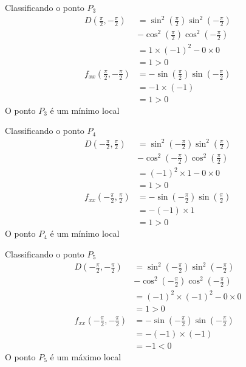 \documentclass[a4paper,12pt,fleqn]{article}
\begin{document}
\begin{answer}
\begin{multicols}{2}
    \vspace{\baselineskip}
    Classificando o ponto $P_3$
    \begin{align*}
      D\left(\frac{\pi}{2}, -\frac{\pi}{2}\right)
      & = \sin^2\left( \frac{\pi}{2}\right)
          \sin^2\left(-\frac{\pi}{2}\right) \\
      & - \cos^2\left( \frac{\pi}{2}\right)
          \cos^2\left(-\frac{\pi}{2}\right) \\
      & = 1 \times (-1)^2 - 0 \times 0 \\
      &  = 1 > 0  \\
      f_{xx}\left(\frac{\pi}{2},-\frac{\pi}{2}\right)
      & = -\sin\left( \frac{\pi}{2}\right)
           \sin\left(-\frac{\pi}{2}\right) \\
      & = -1\times (-1) \\
      &  = 1 > 0
    \end{align*}
    O ponto $P_3$ é um mínimo local

    \vspace{\baselineskip}
    Classificando o ponto $P_4$
    \begin{align*}
      D\left(-\frac{\pi}{2}, \frac{\pi}{2}\right)
      & = \sin^2\left(-\frac{\pi}{2}\right)
          \sin^2\left( \frac{\pi}{2}\right) \\
      & - \cos^2\left(-\frac{\pi}{2}\right)
          \cos^2\left( \frac{\pi}{2}\right) \\
      & = (-1)^2 \times 1 - 0 \times 0 \\
      &  = 1 > 0  \\
      f_{xx}\left(-\frac{\pi}{2}, \frac{\pi}{2}\right)
      & = -\sin\left(-\frac{\pi}{2}\right)
           \sin\left( \frac{\pi}{2}\right) \\
      & = -(-1)\times 1 \\
      &  = 1 > 0
    \end{align*}
    O ponto $P_4$ é um mínimo local

    \vspace{\baselineskip}
    Classificando o ponto $P_5$
    \begin{align*}
      D\left(-\frac{\pi}{2}, -\frac{\pi}{2}\right)
      & = \sin^2\left(-\frac{\pi}{2}\right)
          \sin^2\left(-\frac{\pi}{2}\right) \\
      & - \cos^2\left(-\frac{\pi}{2}\right)
          \cos^2\left(-\frac{\pi}{2}\right) \\
      & = (-1)^2 \times (-1)^2 - 0 \times 0 \\
      & = 1 > 0  \\
      f_{xx}\left(-\frac{\pi}{2},-\frac{\pi}{2}\right)
      & = -\sin\left(-\frac{\pi}{2}\right)
           \sin\left(-\frac{\pi}{2}\right) \\
      & = -(-1) \times (-1) \\
      & = -1 < 0
    \end{align*}
    O ponto $P_5$ é um máximo local
  \end{multicols}
\end{answer}
\end{document}
